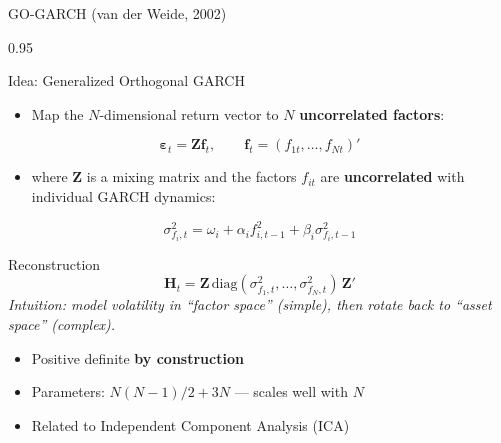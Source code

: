 \documentclass[9pt, aspectratio=169, t]{beamer}
\begin{document}
\begin{frame}{GO-GARCH (van der Weide, 2002)}
    \begin{cminipage}{0.95\textwidth}
    {\footnotesize
    \begin{block}{Idea: Generalized Orthogonal GARCH}
        \begin{itemize}\setlength{\itemsep}{0pt}
            \item Map the $N$-dimensional return vector to $N$ \textbf{uncorrelated factors}:
        \end{itemize}
        \[
            \boldsymbol{\varepsilon}_t = \mathbf{Z}\mathbf{f}_t, \qquad \mathbf{f}_t = (f_{1t}, \ldots, f_{Nt})'
        \]
        \begin{itemize}\setlength{\itemsep}{0pt}
            \item where $\mathbf{Z}$ is a mixing matrix and the factors $f_{it}$ are \textbf{uncorrelated} with individual GARCH dynamics:
        \end{itemize}
        \[
            \sigma_{f_i,t}^2 = \omega_i + \alpha_i f_{i,t-1}^2 + \beta_i \sigma_{f_i,t-1}^2
        \]
    \end{block}
    \vspace{0.1cm}
    \begin{block}{Reconstruction}
        \[
            \mathbf{H}_t = \mathbf{Z}\,\text{diag}(\sigma_{f_1,t}^2, \ldots, \sigma_{f_N,t}^2)\,\mathbf{Z}'
        \]
        \textit{Intuition: model volatility in ``factor space'' (simple), then rotate back to ``asset space'' (complex).}
        \begin{itemize}\setlength{\itemsep}{0pt}
            \item Positive definite \textbf{by construction}
            \item Parameters: $N(N-1)/2 + 3N$ --- scales well with $N$
            \item Related to Independent Component Analysis (ICA)
        \end{itemize}
    \end{block}
    }
    \end{cminipage}
\end{frame}
\end{document}
